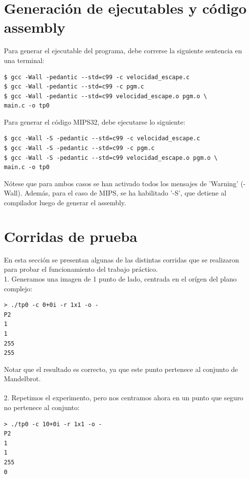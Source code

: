 \documentclass[a4paper,10pt]{article}
\begin{document}
\pagebreak



\section{Generaci\'on de ejecutables y c\'odigo assembly}
Para generar el ejecutable del programa, debe correrse la siguiente sentencia en una terminal:

\begin{verbatim}
$ gcc -Wall -pedantic --std=c99 -c velocidad_escape.c
$ gcc -Wall -pedantic --std=c99 -c pgm.c
$ gcc -Wall -pedantic --std=c99 velocidad_escape.o pgm.o \
main.c -o tp0
\end{verbatim}

Para generar el c\'odigo MIPS32, debe ejecutarse lo siguiente:
\begin{verbatim}
$ gcc -Wall -S -pedantic --std=c99 -c velocidad_escape.c
$ gcc -Wall -S -pedantic --std=c99 -c pgm.c
$ gcc -Wall -S -pedantic --std=c99 velocidad_escape.o pgm.o \
main.c -o tp0
\end{verbatim}

N\'otese que para ambos casos se han activado todos los mensajes de 'Warning' (-Wall). Adem\'as, para el caso de MIPS, se ha habilitado '-S', que detiene al compilador luego de generar el assembly.
\pagebreak




\section{Corridas de prueba}

En esta secci\'on se presentan algunas de las distintas corridas que se 
realizaron para probar el funcionamiento del trabajo pr\'actico.\\

1. Generamos una imagen de 1 punto de lado, centrada en el or\'igen del plano complejo:
\begin{verbatim}
> ./tp0 -c 0+0i -r 1x1 -o -
P2
1
1
255
255
\end{verbatim}

Notar que el resultado es correcto, ya que este punto pertenece al conjunto de Mandelbrot.\\
\\
2. Repetimos el experimento, pero nos centramos ahora en un punto que seguro no pertenece
al conjunto:
\begin{verbatim}
> ./tp0 -c 10+0i -r 1x1 -o -
P2
1
1
255
0
\end{verbatim}
\end{document}
